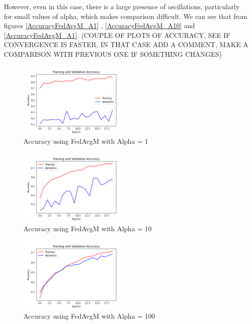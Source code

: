 \documentclass[twocolumn]{article}
\begin{document}
However, even in this case, there is a large presence of oscillations, particularly for small values of alpha, which makes comparison difficult.
We can see that from figures \ref{AccuracyFedAvgM_A1} , \ref{AccuracyFedAvgM_A10} and \ref{AccuracyFedAvgM_A1}.
(COUPLE OF PLOTS OF ACCURACY, SEE IF CONVERGENCE IS FASTER, IN THAT CASE ADD A COMMENT, MAKE A COMPARISON WITH PREVIOUS ONE IF SOMETHING CHANGES)

\begin{figure}
    \centering
    \includegraphics[width=0.5\textwidth,height=.3\textheight]{7_AccuracyFedAvgM_A1.png}
    \caption{Accuracy using FedAvgM with Alpha = 1}
     \label{AccFedAvgMA1} 
\end{figure}

\begin{figure}
    \centering
    \includegraphics[width=0.5\textwidth,height=.3\textheight]{7_AccuracyFedAvgM_A10.png}
    \caption{Accuracy using FedAvgM with Alpha = 10}
     \label{AccFedAvgMA10} 
\end{figure}

\begin{figure}
    \centering
    \includegraphics[width=0.5\textwidth,height=.3\textheight]{7_AccuracyFedAvgM_A100.png}
    \caption{Accuracy using FedAvgM with Alpha = 100}
     \label{AccFedAvgMA100} 
\end{figure}
\end{document}
